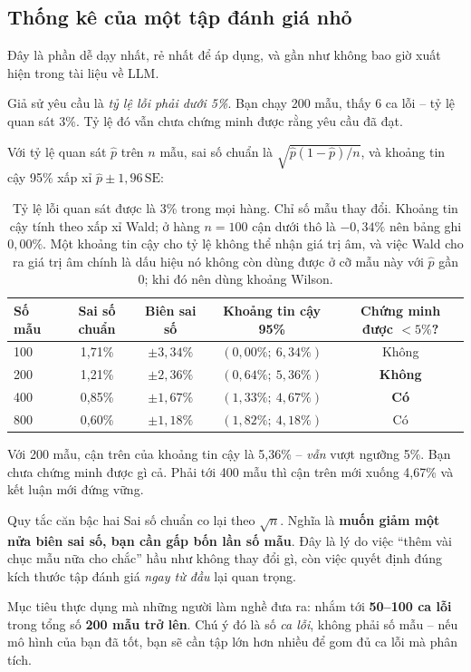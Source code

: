 \subsection{Thống kê của một tập đánh giá nhỏ}
\label{ssec:eval_statistics}

Đây là phần dễ dạy nhất, rẻ nhất để áp dụng, và gần như không bao giờ xuất hiện trong tài liệu về LLM.

Giả sử yêu cầu là \emph{tỷ lệ lỗi phải dưới 5\%}. Bạn chạy 200 mẫu, thấy 6 ca lỗi -- tỷ lệ quan sát 3\%. Tỷ lệ đó vẫn chưa chứng minh được rằng yêu cầu đã đạt.

Với tỷ lệ quan sát $\hat p$ trên $n$ mẫu, sai số chuẩn là $\sqrt{\hat p(1-\hat p)/n}$, và khoảng tin cậy 95\% xấp xỉ $\hat p \pm 1{,}96\,\text{SE}$:

\begin{table}[H]
\centering
\small
\begin{tabular}{@{}lcccc@{}}
\toprule
\textbf{Số mẫu} & \textbf{Sai số chuẩn} & \textbf{Biên sai số} & \textbf{Khoảng tin cậy 95\%} & \textbf{Chứng minh được $<5\%$?} \\
\midrule
100  & 1{,}71\% & $\pm 3{,}34\%$ & $(0{,}00\%;\ 6{,}34\%)$ & Không \\
200  & 1{,}21\% & $\pm 2{,}36\%$ & $(0{,}64\%;\ 5{,}36\%)$ & \textbf{Không} \\
400  & 0{,}85\% & $\pm 1{,}67\%$ & $(1{,}33\%;\ 4{,}67\%)$ & \textbf{Có} \\
800  & 0{,}60\% & $\pm 1{,}18\%$ & $(1{,}82\%;\ 4{,}18\%)$ & Có \\
\bottomrule
\end{tabular}
\caption{Tỷ lệ lỗi quan sát được là 3\% trong mọi hàng. Chỉ số mẫu thay đổi. Khoảng tin cậy tính theo xấp xỉ Wald; ở hàng $n = 100$ cận dưới thô là $-0{,}34\%$ nên bảng ghi $0{,}00\%$. Một khoảng tin cậy cho tỷ lệ không thể nhận giá trị âm, và việc Wald cho ra giá trị âm chính là dấu hiệu nó không còn dùng được ở cỡ mẫu này với $\hat p$ gần 0; khi đó nên dùng khoảng Wilson.}
\label{tab:eval_sample_size}
\end{table}

\noindent Với 200 mẫu, cận trên của khoảng tin cậy là 5{,}36\% -- \emph{vẫn} vượt ngưỡng 5\%. Bạn chưa chứng minh được gì cả. Phải tới 400 mẫu thì cận trên mới xuống 4{,}67\% và kết luận mới đứng vững.

\begin{pitfall}{Quy tắc căn bậc hai}
Sai số chuẩn co lại theo $\sqrt{n}$. Nghĩa là \textbf{muốn giảm một nửa biên sai số, bạn cần gấp bốn lần số mẫu}. Đây là lý do việc “thêm vài chục mẫu nữa cho chắc” hầu như không thay đổi gì, còn việc quyết định đúng kích thước tập đánh giá \emph{ngay từ đầu} lại quan trọng.

Mục tiêu thực dụng mà những người làm nghề đưa ra: nhắm tới \textbf{50--100 ca lỗi} trong tổng số \textbf{200 mẫu trở lên}. Chú ý đó là số \emph{ca lỗi}, không phải số mẫu -- nếu mô hình của bạn đã tốt, bạn sẽ cần tập lớn hơn nhiều để gom đủ ca lỗi mà phân tích.
\end{pitfall}

